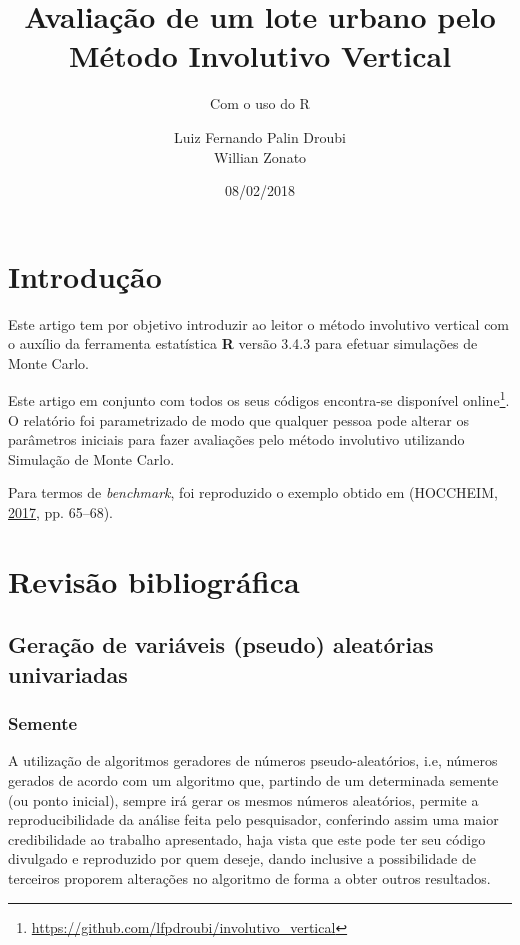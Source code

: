 \documentclass[a4paper]{article}
\title{Avaliação de um lote urbano pelo Método Involutivo Vertical}
\subtitle{Com o uso do R}
\author{Luiz Fernando Palin Droubi \\ Willian Zonato}
\date{08/02/2018}
\let\rmarkdownfootnote\footnote%
\def\footnote{\protect\rmarkdownfootnote}
\begin{document}
\maketitle

\section{Introdução}\label{introducao}

Este artigo tem por objetivo introduzir ao leitor o método involutivo
vertical com o auxílio da ferramenta estatística \textbf{R} versão 3.4.3
para efetuar simulações de Monte Carlo.

Este artigo em conjunto com todos os seus códigos encontra-se disponível
online\footnote{\url{https://github.com/lfpdroubi/involutivo_vertical}}.
O relatório foi parametrizado de modo que qualquer pessoa pode alterar
os parâmetros iniciais para fazer avaliações pelo método involutivo
utilizando Simulação de Monte Carlo.

Para termos de \emph{benchmark}, foi reproduzido o exemplo obtido em
(HOCCHEIM, \protect\hyperlink{ref-hoccheim2}{2017}, pp. 65--68).

\section{Revisão bibliográfica}\label{revisao-bibliografica}

\subsection{Geração de variáveis (pseudo) aleatórias
univariadas}\label{geracao-de-variaveis-pseudo-aleatorias-univariadas}

\subsubsection{Semente}\label{semente}

A utilização de algoritmos geradores de números pseudo-aleatórios, i.e,
números gerados de acordo com um algoritmo que, partindo de um
determinada semente (ou ponto inicial), sempre irá gerar os mesmos
números aleatórios, permite a reproducibilidade da análise feita pelo
pesquisador, conferindo assim uma maior credibilidade ao trabalho
apresentado, haja vista que este pode ter seu código divulgado e
reproduzido por quem deseje, dando inclusive a possibilidade de
terceiros proporem alterações no algoritmo de forma a obter outros
resultados.
\end{document}
